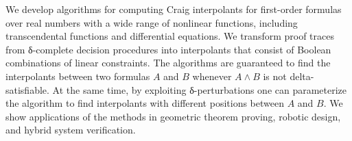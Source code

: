 We develop algorithms for computing Craig interpolants for first-order formulas over real numbers with a wide range of nonlinear functions, including transcendental functions and differential equations.
We transform proof traces from δ-complete decision procedures into interpolants that consist of Boolean combinations of linear constraints.
The algorithms are guaranteed to find the interpolants between two formulas $A$ and $B$ whenever $A ∧ B$ is not delta-satisfiable.
At the same time, by exploiting δ-perturbations one can parameterize the algorithm to find interpolants with different positions between $A$ and $B$.
We show applications of the methods in geometric theorem proving, robotic design, and hybrid system verification.  
